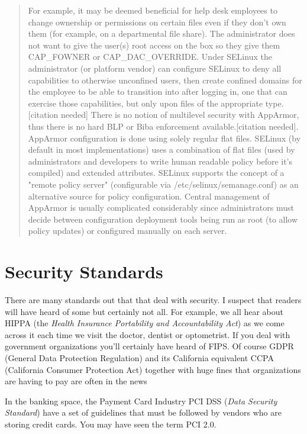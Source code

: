 \begin{quote}
For example, it may be deemed beneficial for help desk employees to change ownership or permissions on certain files even if they don't own them (for example, on a departmental file share). The administrator does not want to give the user(s) root access on the box so they give them CAP\_FOWNER or CAP\_DAC\_OVERRIDE. Under SELinux the administrator (or platform vendor) can configure SELinux to deny all capabilities to otherwise unconfined users, then create confined domains for the employee to be able to transition into after logging in, one that can exercise those capabilities, but only upon files of the appropriate type.[citation needed]
There is no notion of multilevel security with AppArmor, thus there is no hard BLP or Biba enforcement available.[citation needed].
AppArmor configuration is done using solely regular flat files. SELinux (by default in most implementations) uses a combination of flat files (used by administrators and developers to write human readable policy before it's compiled) and extended attributes.
SELinux supports the concept of a "remote policy server" (configurable via /etc/selinux/semanage.conf) as an alternative source for policy configuration. Central management of AppArmor is usually complicated considerably since administrators must decide between configuration deployment tools being run as root (to allow policy updates) or configured manually on each server.
\end{quote}

\section{Security Standards}

There are many standards out that that deal with security. I suspect that readers will have heard of some but certainly not all. For example, we all hear about HIPPA (the \textit{Health Insurance Portability and Accountability Act}) as we come across it each time we visit the doctor, dentist or optometrist. If you deal with government organizations you'll certainly have heard of FIPS. Of course GDPR (General Data Protection Regulation) and its California equivalent CCPA (California Consumer Protection Act) together with huge fines that organizations are having to pay are often in the news

In the banking space, the Payment Card Industry PCI DSS (\textit{Data Security Standard}) have a set of guidelines that must be followed by vendors who are storing credit cards. You may have seen the term PCI 2.0.

